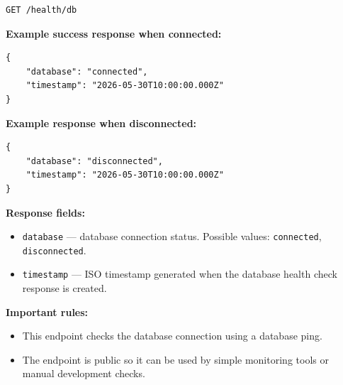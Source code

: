 \begin{verbatim}
GET /health/db
\end{verbatim}

\textbf{Example success response when connected:}

\begin{verbatim}
{
    "database": "connected",
    "timestamp": "2026-05-30T10:00:00.000Z"
}
\end{verbatim}

\pagebreak
\textbf{Example response when disconnected:}

\begin{verbatim}
{
    "database": "disconnected",
    "timestamp": "2026-05-30T10:00:00.000Z"
}
\end{verbatim}

\textbf{Response fields:}

\begin{itemize}
    \item \texttt{database} --- database connection status. Possible values: \texttt{connected}, \texttt{disconnected}.
    \item \texttt{timestamp} --- ISO timestamp generated when the database health check response is created.
\end{itemize}

\textbf{Important rules:}

\begin{itemize}
    \item This endpoint checks the database connection using a database ping.
    \item The endpoint is public so it can be used by simple monitoring tools or manual development checks.
\end{itemize}